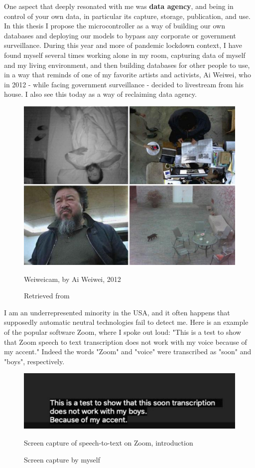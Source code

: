 One aspect that deeply resonated with me was \textbf{data agency}, and being in control of your own data, in particular its capture, storage, publication, and use. In this thesis I propose the microcontroller as a way of building our own databases and deploying our models to bypass any corporate or government surveillance. During this year and more of pandemic lockdown context, I have found myself several times working alone in my room, capturing data of myself and my living environment, and then building databases for other people to use, in a way that reminds of one of my favorite artists and activists, Ai Weiwei, who in 2012 - while facing government surveillance - decided to livestream from his house. I also see this today as a way of reclaiming data agency.

\begin{figure}[ht]
  \centering
  \includegraphics[width=0.75\linewidth,height=0.30\textheight,keepaspectratio]{images/weiweicam.jpg}
  \caption{Weiweicam, by Ai Weiwei, 2012}
  \caption*{Retrieved from \cite{website-forbes-ai-weiwei-cam}}
  \label{fig:weiweicam}
\end{figure}

I am an underrepresented minority in the USA, and it often happens that supposedly automatic neutral technologies fail to detect me. Here is an example of the popular software Zoom, where I spoke out loud: "This is a test to show that Zoom speech to text transcription does not work with my voice because of my accent." Indeed the words "Zoom" and "voice" were transcribed as "soon" and "boys", respectively.

\begin{figure}[ht]
  \centering
  \includegraphics[width=0.75\linewidth,height=0.25\textheight,keepaspectratio]{images/zoom-introduction.jpg}
  \caption{Screen capture of speech-to-text on Zoom, introduction}
  \caption*{Screen capture by myself}
  \label{fig:zoom-voice}
\end{figure}

